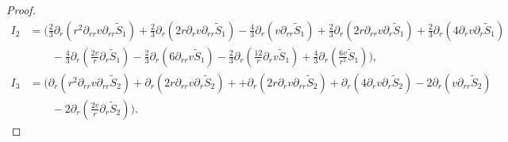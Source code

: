 \documentclass[10pt,reqno]{amsart}
\numberwithin{equation}{section}
\begin{document}
\begin{proof}
		\begin{equation}\nonumber
			\begin{aligned}
				I_2&=\bigg(\frac{2}{3}\partial_{r}(r^2\partial_{rr}v\partial_{rr}\tilde{S}_1)
				+\frac{2}{3}\partial_{r}(2r\partial_{r}v\partial_{rr}\tilde{S}_1)
				-\frac{4}{3}\partial_{r}(v\partial_{rr}\tilde{S}_1)
				+\frac{2}{3}\partial_{r}(2r\partial_{rr}v\partial_{r}\tilde{S}_1)
				+\frac{2}{3}\partial_{r}(4\partial_{r}v\partial_{r}\tilde{S}_1)\\
				&\quad\quad-\frac{4}{3}\partial_{r} (\frac{2v}{r}\partial_{r}\tilde{S}_1)
				-\frac{2}{3}\partial_{r}(6\partial_{rr}v\tilde{S}_1)
				-\frac{2}{3}\partial_{r}(\frac{12}{r}\partial_{r}v\tilde{S}_1)
				+\frac{4}{3}\partial_{r}( \frac{6v}{r^2}\tilde{S}_1)\bigg),\\
				I_3&=\bigg(\partial_{r}(r^2\partial_{rr}v\partial_{rr}\tilde{S}_2)+\partial_{r}(2r\partial_{rr}v\partial_{r}\tilde{S}_2)++\partial_{r}(2r\partial_{r}v\partial_{rr}\tilde{S}_2)+\partial_{r}(4\partial_{r}v\partial_{r}\tilde{S}_2)-2\partial_{r}(v\partial_{rr}\tilde{S}_2)\\
				&\quad\quad-2\partial_{r}(\frac{2v}{r}\partial_{r}\tilde{S}_2)\bigg).
			\end{aligned}
		\end{equation}
		

\end{proof}
\end{document}
